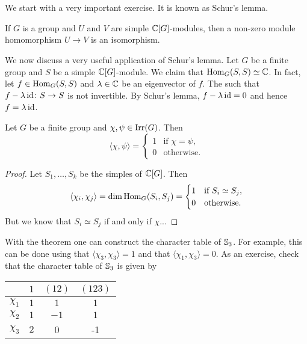 \chapter{}


We start with a very important exercise. It is known as Schur's lemma. 

\begin{exercise}
\label{xca:Schur}
    If $G$ is a group and  
    $U$ and $V$ are simple $\mathbb{C}[G]$-modules, then 
    a non-zero module homomorphism $U\to V$ is an isomorphism. 
\end{exercise}

We now discuss a very useful application of Schur's lemma. 
Let $G$ be a finite group and $S$ be a simple $\mathbb{C}[G]$-module.
We claim that $\operatorname{Hom}_G(S,S)\simeq\mathbb{C}$. In fact, let 
$f\in\operatorname{Hom}_G(S,S)$ and $\lambda\in\mathbb{C}$ be an eigenvector of $f$. The such that 
$f-\lambda\operatorname{id}\colon S\to S$ is not invertible. By Schur's lemma, 
$f-\lambda\operatorname{id}=0$ and hence $f=\lambda\operatorname{id}$. 

\begin{theorem}[Schur]
    Let $G$ be a finite group and $\chi,\psi\in\operatorname{Irr}(G)$. Then
    \[
    \langle\chi,\psi\rangle=\begin{cases}
    1 & \text{if $\chi=\psi$,}\\
    0 & \text{otherwise.}
    \end{cases}
    \]
\end{theorem}

\begin{proof}
    Let $S_1,\dots,S_k$ be the simples of $\mathbb{C}[G]$. Then 
    \[
    \langle\chi_i,\chi_j\rangle=\dim\operatorname{Hom}_G(S_i,S_j)
    =\begin{cases}
    1 & \text{if $S_i\simeq S_j$},\\
    0 & \text{otherwise.}
    \end{cases}
    \]
    But we know that $S_i\simeq S_j$ if and only if 
    $\chi$...
\end{proof}

With the theorem one can construct the character table of $\mathbb{S}_3$.
For example, this can be done using that $\langle\chi_3,\chi_3\rangle=1$ 
and that $\langle\chi_1,\chi_3\rangle=0$. 
As an exercise, check that the character table of $\mathbb{S}_3$ 
is given by
    \begin{center}
		\begin{tabular}{|c|ccc|}
			\hline
			& $1$ & $(12)$ & $(123)$ \tabularnewline
			\hline 
			$\chi_{1}$ & $1$ & $1$ & $1$\tabularnewline
			$\chi_{2}$ & $1$ & $-1$ & $1$ \tabularnewline
			$\chi_{3}$ & $2$ & 0 & -1 \tabularnewline
			\hline
		\end{tabular}
	\end{center}
	
